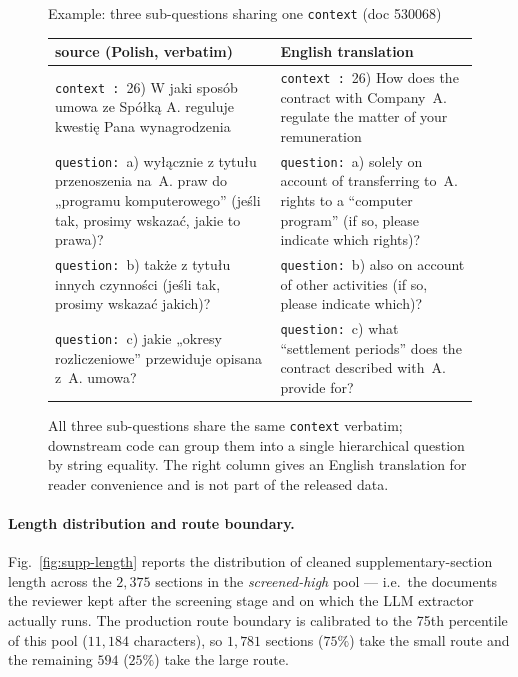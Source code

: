 \begin{figure}[!htb]
\begin{examplebox}{Example: three sub-questions sharing one \texttt{context} (doc 530068)}
\footnotesize
\begin{tabularx}{\linewidth}{@{}>{\raggedright\arraybackslash}X@{\hspace{1em}}>{\raggedright\arraybackslash}X@{}}
\toprule
\textbf{source (Polish, verbatim)} & \textbf{English translation} \\
\midrule
\texttt{context :}~26) W jaki sposób umowa ze Spółką A. reguluje kwestię Pana wynagrodzenia &
\texttt{context :}~26) How does the contract with Company~A. regulate the matter of your remuneration \\
\addlinespace
\texttt{question:}~a) wyłącznie z tytułu przenoszenia na~A. praw do „programu komputerowego'' (jeśli tak, prosimy wskazać, jakie to prawa)? &
\texttt{question:}~a) solely on account of transferring to~A. rights to a ``computer program'' (if so, please indicate which rights)? \\
\addlinespace
\texttt{question:}~b) także z tytułu innych czynności (jeśli tak, prosimy wskazać jakich)? &
\texttt{question:}~b) also on account of other activities (if so, please indicate which)? \\
\addlinespace
\texttt{question:}~c) jakie „okresy rozliczeniowe'' przewiduje opisana z~A. umowa? &
\texttt{question:}~c) what ``settlement periods'' does the contract described with~A. provide for? \\
\bottomrule
\end{tabularx}
\end{examplebox}
\caption{All three sub-questions share the same \texttt{context}
verbatim; downstream code can group them into a single hierarchical
question by string equality. The right column gives an English
translation for reader convenience and is not part of the released
data.}
\label{fig:context-example}
\end{figure}

\paragraph{Length distribution and route boundary.}

Fig.~\ref{fig:supp-length} reports the distribution of cleaned
supplementary-section length across the $2{,}375$ sections in the
\emph{screened-high} pool --- i.e.\ the documents the reviewer
kept after the screening stage and on which the LLM extractor actually
runs. The production route boundary is calibrated to the 75th
percentile of this pool ($11{,}184$ characters), so
$1{,}781$ sections ($75\%$) take the small route and the
remaining $594$ ($25\%$) take the large route.

